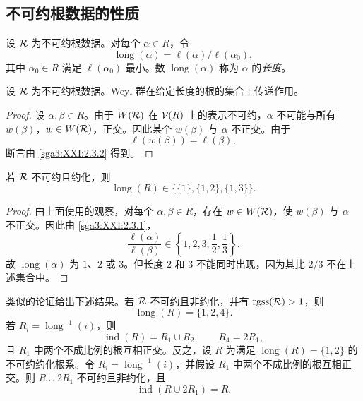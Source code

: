 \subsection{不可约根数据的性质}
\label{sga3:XXI:7.2}

\begin{definition}\label{sga3:XXI:7.2.1}
设 \(\mathcal{R}\) 为不可约根数据。对每个 \(\alpha\in R\)，令
\[
 \operatorname{long}(\alpha)
 =\ell(\alpha)/\ell(\alpha_0),
\]
其中 \(\alpha_0\in R\) 满足 \(\ell(\alpha_0)\) 最小。数 \(\operatorname{long}(\alpha)\) 称为 \(\alpha\) 的\emph{长度}。
\end{definition}

\begin{lemma}\label{sga3:XXI:7.2.2}
设 \(\mathcal{R}\) 为不可约根数据。Weyl 群在给定长度的根的集合上传递作用。
\end{lemma}

\begin{proof}
设 \(\alpha,\beta\in R\)。由于 \(W(\mathcal{R})\) 在 \(\mathcal{V}(R)\) 上的表示不可约，\(\alpha\) 不可能与所有 \(w(\beta)\)，\(w\in W(\mathcal{R})\)，正交。因此某个 \(w(\beta)\) 与 \(\alpha\) 不正交。由于
\[
 \ell(w(\beta))=\ell(\beta),
\]
断言由 \ref{sga3:XXI:2.3.2} 得到。
\end{proof}

\begin{lemma}\label{sga3:XXI:7.2.3}
若 \(\mathcal{R}\) 不可约且约化，则
\[
 \operatorname{long}(R)
 \in\bigl\{\{1\},\{1,2\},\{1,3\}\bigr\}.
\]
\end{lemma}

\begin{proof}
由上面使用的观察，对每个 \(\alpha,\beta\in R\)，存在 \(w\in W(\mathcal{R})\)，使 \(w(\beta)\) 与 \(\alpha\) 不正交。因此由 \ref{sga3:XXI:2.3.1}，
\[
 \frac{\ell(\alpha)}{\ell(\beta)}
 \in\left\{1,2,3,\frac12,\frac13\right\}.
\]
故 \(\operatorname{long}(\alpha)\) 为 \(1\)、\(2\) 或 \(3\)。但长度 \(2\) 和 \(3\) 不能同时出现，因为其比 \(2/3\) 不在上述集合中。
\end{proof}

\begin{remark}\label{sga3:XXI:7.2.4}
类似的论证给出下述结果。若 \(\mathcal{R}\) 不可约且非约化，并有 \(\operatorname{rgss}(\mathcal{R})>1\)，则
\[
 \operatorname{long}(R)=\{1,2,4\}.
\]
若 \(R_i=\operatorname{long}^{-1}(i)\)，则
\[
 \operatorname{ind}(R)=R_1\cup R_2,\qquad R_4=2R_1,
\]
且 \(R_1\) 中两个不成比例的根互相正交。反之，设 \(R\) 为满足 \(\operatorname{long}(R)=\{1,2\}\) 的不可约约化根系。令 \(R_i=\operatorname{long}^{-1}(i)\)，并假设 \(R_1\) 中两个不成比例的根互相正交。则 \(R\cup2R_1\) 不可约且非约化，且
\[
 \operatorname{ind}(R\cup2R_1)=R.
\]
\end{remark}

